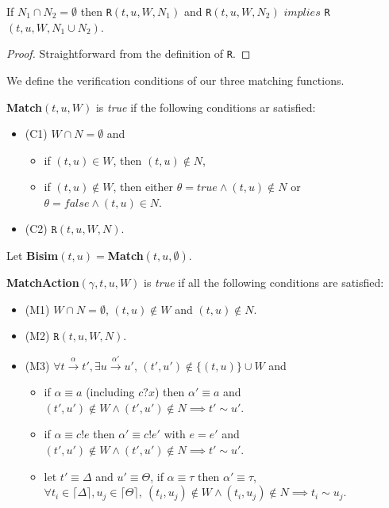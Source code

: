 \documentclass[a4paper,UKenglish,cleveref, autoref]{lipics-v2019}
\begin{document}
\begin{lemma}\label{lem:n_merge}
	If $N_1\cap N_2=\emptyset$ then \texttt{R}$(t,u,W,N_1)$ and \texttt{R}$(t,u,W,N_2)$ $implies$ \texttt{R}$(t,u,W,N_1\cup N_2)$.
\end{lemma}
\begin{proof}
	Straightforward from the definition of \texttt{R}.
\end{proof}

We define the verification conditions of our three matching functions.
\begin{definition}\label{def:match}
	\textbf{Match}$(t,u,W)$ is \textit{true} if the following conditions ar satisfied:
	\begin{itemize}
		\item(C1) $W\cap N=\emptyset$ and
		\begin{itemize}
			\item if $(t,u)\in W$, then $(t,u)\notin N$,
			\item if $(t,u)\notin W$, then either $\theta=true\wedge(t,u)\notin N$ or $\theta=false\wedge(t,u)\in N$.
		\end{itemize}
		\item(C2) $\texttt{R}(t,u,W,N)$.
	\end{itemize}
	Let \textbf{Bisim}$(t,u)=$\textbf{Match}$(t,u,\emptyset)$.
\end{definition}

\begin{definition}\label{def:matchaction}
	\textbf{MatchAction}$(\gamma,t,u,W)$ is \textit{true} if all the following conditions are satisfied:
	\begin{itemize}
		\item(M1) $W\cap N=\emptyset$, $(t,u)\notin W$ and $(t,u)\notin N$.
		\item(M2) $\texttt{R}(t,u,W,N)$.
		\item(M3) $\forall t\xrightarrow{\alpha}t', \exists u\xrightarrow{\alpha'}u'$, $(t',u')\notin \{(t,u)\}\cup W$ and 
		\begin{itemize}
			\item if $\alpha\equiv a$ (including $c?x$) then $\alpha'\equiv a$ and $(t',u')\notin W\wedge(t',u')\notin N\implies t'\sim u'$.
			\item if $\alpha\equiv c!e$ then $\alpha'\equiv c!e'$ with $e=e'$ and $(t',u')\notin W\wedge(t',u')\notin N\implies t'\sim u'$.
			\item let $t'\equiv \Delta$ and $u'\equiv \Theta$, if $\alpha\equiv \tau$ then $\alpha'\equiv \tau$, $\forall t_i\in \lceil\Delta\rceil, u_j\in \lceil\Theta\rceil,\ (t_i,u_j)\notin W\wedge(t_i,u_j)\notin N\implies t_i\sim u_j$.
		\end{itemize}
	\end{itemize}
\end{definition}
\end{document}
